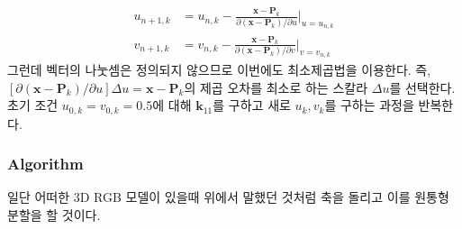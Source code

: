 \documentclass{gshs_thesis}
\theoremstyle{theorem}
\theoremstyle{lemma}
\theoremstyle{definition}
\begin{document}
\begin{align} 
	u_{n+1, k}&=u_{n, k}-\frac{\mathbf{x}-\mathbf{P}_k}{\partial(\mathbf{x}-\mathbf{P}_k)/\partial u} \bigg|_{u=u_{n, k}} \\
	v_{n+1, k}&=v_{n, k}-\frac{\mathbf{x}-\mathbf{P}_k}{\partial(\mathbf{x}-\mathbf{P}_k)/\partial v} \bigg|_{v=v_{n, k}} 
\end{align}
그런데 벡터의 나눗셈은 정의되지 않으므로 이번에도 최소제곱법을 이용한다. 즉, $[\partial(\mathbf{x}-\mathbf{P}_k)/\partial u] \Delta u = \mathbf{x}-\mathbf{P}_k$의 제곱 오차를 최소로 하는 스칼라 $\Delta u$를 선택한다. \\

초기 조건 $u_{0, k}=v_{0, k}=0.5$에 대해 $\mathbf{k}_{11}$를 구하고 새로 $u_k, v_k$를 구하는 과정을 반복한다. 

\subsubsection{Algorithm}
일단 어떠한 3D RGB 모델이 있을때 위에서 말했던 것처럼 축을 돌리고 이를 원통형 분할을 할 것이다.
\end{document}
